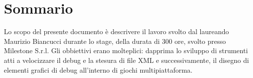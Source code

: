 
\cleardoublepage
{}
{}
\begingroup
\let\clearpage\relax
\let\cleardoublepage\relax
\let\cleardoublepage\relax

\chapter*{Sommario}

Lo scopo del presente documento è descrivere il lavoro svolto dal laureando Maurizio Biancucci durante lo stage, della durata di 300 ore, svolto presso Milestone S.r.l.
Gli obbiettivi erano molteplici: dapprima lo sviluppo di strumenti atti a velocizzare il debug e la stesura di file XML e successivamente, il disegno di elementi grafici di debug all'interno di giochi multipiattaforma.

%
%

\endgroup			

\vfill

